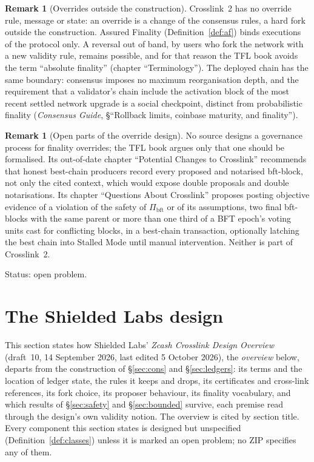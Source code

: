 \documentclass[11pt,a4paper]{article}
\theoremstyle{definition}
\newtheorem{remark}[theorem]{Remark}
\newcommand{\bft}{\mathrm{bft}}
\newcommand{\Pibft}{\Pi_{\bft}}
\begin{document}
\begin{remark}[Overrides outside the construction]\label{rem:override-outside}
Crosslink~2 has no override rule, message or state: an override is a change
of the consensus rules, a hard fork outside the construction. Assured
Finality (Definition~\ref{def:af}) binds executions of the protocol only. A
reversal out of band, by users who fork the network with a new validity
rule, remains possible, and for that reason the TFL book avoids the term
``absolute finality'' (chapter ``Terminology''). The deployed chain has the
same boundary: consensus imposes no maximum reorganisation depth, and the
requirement that a validator's chain include the activation block of the
most recent settled network upgrade is a social checkpoint, distinct from
probabilistic finality (\emph{Consensus Guide}, \S``Rollback limits,
coinbase maturity, and finality'').
\end{remark}

\begin{remark}[Open parts of the override design]\label{rem:override-open}
No source designs a governance process for finality overrides; the TFL book
argues only that one should be formalised. Its out-of-date chapter
``Potential Changes to Crosslink'' recommends that honest best-chain
producers record every proposed and notarised bft-block, not only the cited
context, which would expose double proposals and double notarisations. Its
chapter ``Questions About Crosslink'' proposes posting objective evidence of
a violation of the safety of $\Pibft$ or of its assumptions, two final
bft-blocks with the same parent or more than one third of a BFT epoch's
voting units cast for conflicting blocks, in a best-chain transaction,
optionally latching the best chain into Stalled Mode until manual
intervention. Neither is part of Crosslink~2.

Status: open problem.
\end{remark}

\section{The Shielded Labs design}\label{sec:sl}

This section states how Shielded Labs' \emph{Zcash Crosslink Design
Overview} (draft~10, 14 September 2026, last edited 5 October 2026), the
\emph{overview} below, departs from the construction of \S\ref{sec:cons}
and \S\ref{sec:ledgers}: its terms and the location of ledger state, the
rules it keeps and drops, its certificates and cross-link references, its
fork choice, its proposer behaviour, its finality vocabulary, and which
results of \S\ref{sec:safety} and \S\ref{sec:bounded} survive, each premise
read through the design's own validity notion. The overview is cited by
section title. Every component this section states is designed but
unspecified (Definition~\ref{def:classes}) unless it is marked an open
problem; no ZIP specifies any of them.
\end{document}
